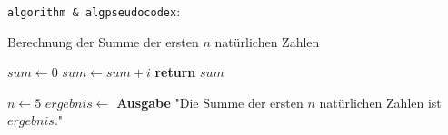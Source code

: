 \documentclass{article}
\begin{document}
\lipsum[1]
\texttt{algorithm \& algpseudocodex}:
\begin{algorithm}
\caption{Berechnung der Summe der ersten $n$ natürlichen Zahlen}
\begin{algorithmic}[1]
    \State $sum \gets 0$
        \State $sum \gets sum + i$
    \EndFor
    \State \textbf{return} $sum$
\EndProcedure
\end{algorithmic}
\end{algorithm}
\begin{algorithm}
\begin{algorithmic}[1]
\State $n \gets 5$
\State $ergebnis \gets$ 
\State \textbf{Ausgabe} "Die Summe der ersten $n$ natürlichen Zahlen ist $ergebnis$."
\end{algorithmic}
\end{algorithm}
\end{document}
